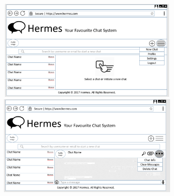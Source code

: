 \documentclass{article}
\begin{document}
\begin{appendices}
\begin{center}
\includegraphics[width=10cm, height=5cm]{w5}
\includegraphics[width=10cm, height=5cm]{w6}
\end{center}


\end{appendices}
\end{document}
